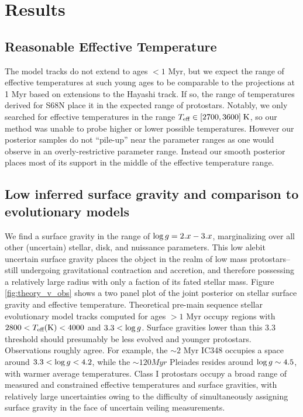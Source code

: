 \documentclass[twocolumn]{emulateapj}%
\begin{document}
\section{Results}

\subsection{Reasonable Effective Temperature}
The \citet{baraffe15} model tracks do not extend to ages $<1 $ Myr, but we expect the range of effective temperatures at such young ages to be comparable to the projections at 1 Myr based on extensions to the Hayashi track.  If so, the range of temperatures derived for S68N place it in the expected range of protostars.  Notably, we only searched for effective temperatures in the range $T_\textrm{eff} \in [2700,3600] \; \mathrm{K}$, so our method was unable to probe higher or lower possible temperatures.  However our posterior samples do not ``pile-up'' near the parameter ranges as one would observe in an overly-restrictive parameter range.  Instead our smooth posterior places most of its support in the middle of the effective temperature range.

\subsection{Low inferred surface gravity and comparison to evolutionary models}

We find a surface gravity in the range of $\log g = 2.x-3.x$, marginalizing over all other (uncertain) stellar, disk, and nuissance parameters.  This low alebit uncertain surface gravity places the object in the realm of low mass protostars-- still undergoing gravitational contraction and accretion, and therefore possessing a relatively large radius with only a faction of its fated stellar mass.  Figure \ref{fig:theory_v_obs} shows a two panel plot of the joint posterior on stellar surface gravity and effective temperature.  Theoretical pre-main sequence stellar evolutionary model tracks computed for ages $>1$ Myr \citep{baraffe15} occupy regions with $2800 < T_\textrm{eff} (\mathrm{K}) < 4000$ and $3.3<\log g$.  Surface gravities lower than this 3.3 threshold should presumably be less evolved and younger protostars.  Observations roughly agree.  For example, the $\sim 2$ Myr IC348 occupies a space around $3.3 < \log g <4.2$, while the $\sim 120 Myr$ Pleiades resides around $\log g\sim 4.5$, with warmer average temperatures.  Class I protostars \citep{2005AJ....130.1145D} occupy a broad range of measured and constrained effective temperatures and surface gravities, with relatively large uncertainties owing to the difficulty of simultaneously assigning surface gravity in the face of uncertain veiling measurements. 
\end{document}

